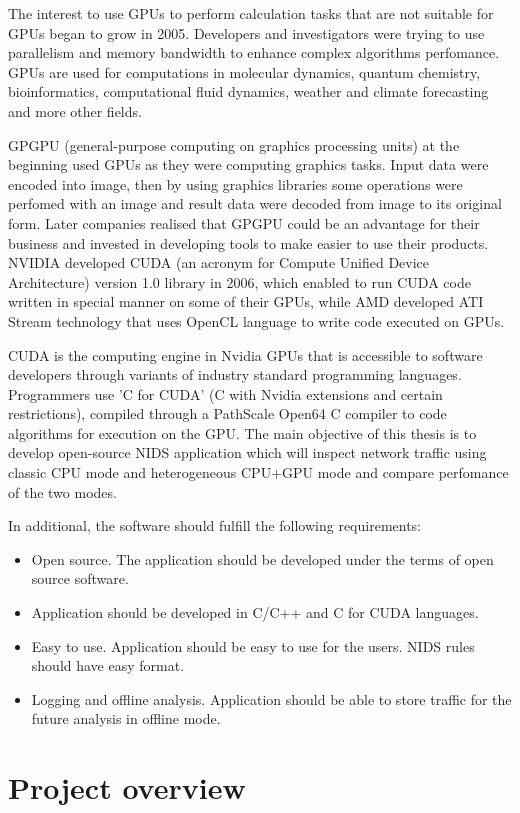 \documentclass[thesis=M,english]{FITthesis}[2011/07/15]
\begin{document}
The interest to use GPUs to perform calculation tasks that are not suitable for GPUs began to grow in 2005. Developers and investigators were trying to use parallelism and memory bandwidth to enhance complex algorithms perfomance. GPUs are used for computations in molecular dynamics, quantum chemistry, bioinformatics, computational fluid dynamics, weather and climate forecasting and more other fields.

GPGPU (general-purpose computing on graphics processing units) at the beginning used GPUs as they were computing graphics tasks. Input data were encoded into image, then by using graphics libraries some operations were perfomed with an image and result data were decoded from image to its original form. Later companies realised that GPGPU could be an advantage for their business and invested in developing tools to make easier to use their products. NVIDIA developed CUDA (an acronym for Compute Unified Device Architecture) version 1.0 library in 2006, which enabled to run CUDA code written in special manner on some of their GPUs, while AMD developed ATI Stream technology that uses OpenCL language to write code executed on GPUs.

CUDA is the computing engine in Nvidia GPUs that is accessible to software developers through variants of industry standard programming languages. Programmers use 'C for CUDA' (C with Nvidia extensions and certain restrictions), compiled through a PathScale Open64 C compiler to code algorithms for execution on the GPU.
The main objective of this thesis is to develop open-source NIDS application which will inspect network traffic using classic CPU mode and heterogeneous CPU+GPU mode and compare perfomance of the two modes. 

In additional, the software should fulfill the following requirements:
\begin{itemize}
\item Open source. The application should be developed under the terms of open source software.
\item Application should be developed in C/C++ and C for CUDA languages.
\item Easy to use. Application should be easy to use for the users. NIDS rules should have easy format.
\item Logging and offline analysis. Application should be able to store traffic for the future analysis in offline mode.
\end{itemize}

\section{Project overview}
\end{document}
